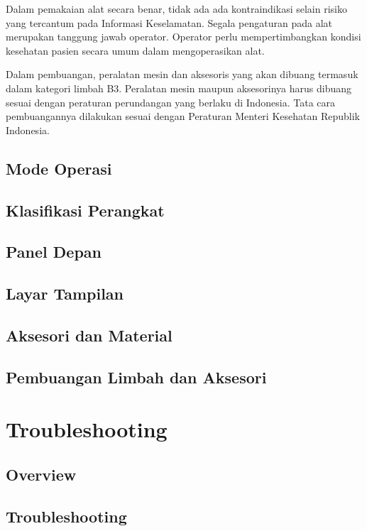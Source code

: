 \documentclass[11pt,a4paper,twoside,onecolumn]{book}
\begin{document}
		Dalam pemakaian alat secara benar, tidak ada ada kontraindikasi selain risiko yang tercantum pada Informasi Keselamatan. Segala pengaturan pada alat merupakan tanggung jawab operator. Operator perlu mempertimbangkan kondisi kesehatan pasien secara umum dalam mengoperasikan alat.
		
		Dalam pembuangan, peralatan mesin dan aksesoris yang akan dibuang termasuk dalam kategori limbah B3. Peralatan mesin maupun aksesorinya harus dibuang sesuai dengan peraturan perundangan yang berlaku di Indonesia. Tata cara pembuangannya dilakukan sesuai dengan Peraturan Menteri Kesehatan Republik Indonesia.
		
		\section{Mode Operasi}
		
		\section{Klasifikasi Perangkat}
		
		\section{Panel Depan}
		
		\section{Layar Tampilan}
		
		\section{Aksesori dan Material}
		
		\section{Pembuangan Limbah dan Aksesori}
		
	\newpage
	
	\chapter{Troubleshooting}
		\section{Overview}
		\section{Troubleshooting}
	\newpage
	
\end{document}
